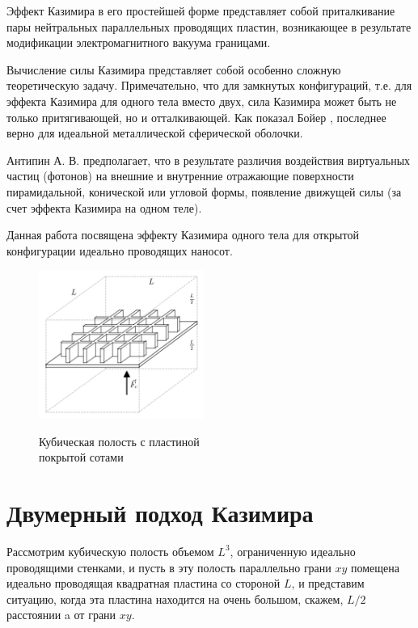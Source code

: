 \documentclass[11pt]{article}
\begin{document}
Эффект Казимира в его простейшей форме представляет собой приталкивание
пары нейтральных параллельных проводящих пластин, возникающее в
результате модификации электромагнитного вакуума границами.

Вычисление силы Казимира представляет собой особенно сложную
теоретическую задачу. Примечательно, что для замкнутых конфигураций,
т.е. для эффекта Казимира для одного тела вместо двух, сила Казимира
может быть не только притягивающей, но и отталкивающей. Как показал
Бойер \cite{Boyer1968}, последнее верно для идеальной металлической
сферической оболочки.

Антипин А. В. \cite{Antipin2012} предполагает, что в результате различия
воздействия виртуальных частиц (фотонов) на внешние и внутренние
отражающие поверхности пирамидальной, конической или угловой формы,
появление движущей силы (за счет эффекта Казимира на одном теле).

Данная работа посвящена эффекту Казимира одного тела для открытой
конфигурации идеально проводящих наносот.

    \begin{figure}
\begin{center}
\includegraphics[width=0.48\textwidth]{honeycomb_box_L.png}
\caption{}{Кубическая полость с пластиной \\ покрытой сотами}
\end{center}
\label{fig:honeycomb_box_L}
\end{figure}

    \section{Двумерный подход
Казимира}\label{ux434ux432ux443ux43cux435ux440ux43dux44bux439-ux43fux43eux434ux445ux43eux434-ux43aux430ux437ux438ux43cux438ux440ux430}

    Рассмотрим кубическую полость объемом \(L^3\), ограниченную идеально
проводящими стенками, и пусть в эту полость параллельно грани \(xy\)
помещена идеально проводящая квадратная пластина со стороной \(L\), и
представим ситуацию, когда эта пластина находится на очень большом,
скажем, \(L/2\) расстоянии a от грани \(xy\).
\end{document}
